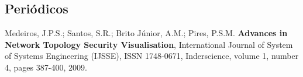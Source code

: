 \subsection*{Periódicos}
\begin{compactenum}

\item Medeiros, J.P.S.; Santos, S.R.; Brito Júnior, A.M.; Pires, P.S.M.
{\bf Advances in Network Topology Security Visualisation},
International Journal of System of Systems Engineering (IJSSE), ISSN 1748-0671,
Inderscience, volume 1, number 4, pages 387-400, 2009.

\end{compactenum}

